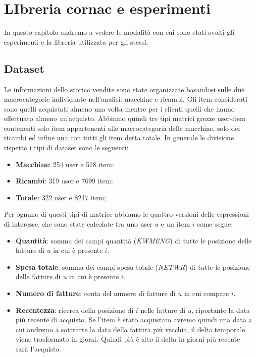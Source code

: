 \hypertarget{(chap:capitolo6)}{}
\chapter{LIbreria cornac e esperimenti}
In questo capitolo  andremo a vedere le modalità con cui sono stati svolti gli esperimenti e la libreria utilizzata per gli stessi.

\section{Dataset}
Le informazioni dello storico vendite sono state organizzate basandosi sulle due macrocategorie individuate nell'analisi: macchine e ricambi.
Gli item considerati sono quelli acquistati almeno una volta mentre per i clienti quelli che hanno effettuato almeno un'acquisto.
Abbiamo quindi tre tipi matrici grezze user-item contenenti solo item appartenenti alle macrocategoria delle macchine, solo dei ricambi ed infine una con tutti gli item detta totale.
In generale le divisione rispetto i tipi di dataset sono le seguenti:
\begin{itemize}
    \item \textbf{Macchine}: 254 user e 518 item;
    \item \textbf{Ricambi}: 319 user e 7699 item;
    \item \textbf{Totale}: 322 user e 8217 item;
\end{itemize}

Per ognuno di questi tipi di matrice abbiamo le quattro versioni delle espressioni di interesse, che sono state calcolate tra uno user $u$ e un item $i$ come segue:
\begin{itemize}
    \item \textbf{Quantità}: somma dei campi quantità (\textit{KWMENG}) di tutte le posizione delle fatture di $u$ in cui è presente $i$.
    \item \textbf{Spesa totale}: somma dei campi spesa totale (\textit{NETWR}) di tutte le posizione delle fatture di $u$ in cui è presente $i$.
    \item \textbf{Numero di fatture}: conta del numero di fatture di $u$ in cui compare $i$.
    \item \textbf{Recentezza}: ricerca della posizione di $i$ nelle fatture di $u$, riportante la data più recente di acquisto. Se l'item è stato acquistato avremo quindi una data a cui andremo a sottrarre la data della fattura più vecchia, il delta temporale viene trasformato in giorni. Quindi più è alto il delta in giorni più recente sarà l'acquisto.
\end{itemize}

